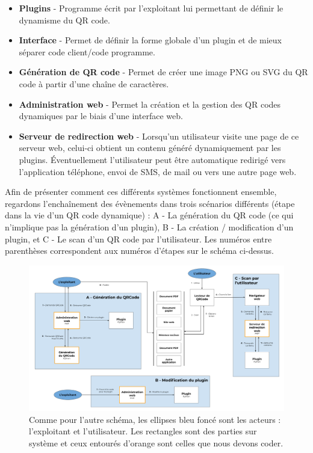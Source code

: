 \documentclass[a4paper,12pt]{article}
\begin{document}
\begin{itemize}
  \item \textbf{Plugins} - Programme écrit par l'exploitant lui permettant de définir le dynamisme du QR code.\\
  
  \item \textbf{Interface} - Permet de définir la forme globale d'un plugin et de mieux séparer code client/code programme.\\
  
  \item \textbf{Génération de QR code} - Permet de créer une image PNG ou SVG du QR code à partir d'une chaîne de caractères.\\
  
  \item \textbf{Administration web} - Permet la création et la gestion des QR codes dynamiques par le biais d'une interface web.\\
  
  \item \textbf{Serveur de redirection web} - Lorsqu'un utilisateur visite une page de ce serveur web, celui-ci obtient un contenu généré dynamiquement par les plugins. Éventuellement l'utilisateur peut être automatique redirigé vers l'application téléphone, envoi de SMS, de mail ou vers une autre page web.\\
  
\end{itemize}

Afin de présenter comment ces différents systèmes fonctionnent ensemble, regardons l'enchaînement des évènements dans trois scénarios différents (étape dans la vie d'un QR code dynamique) : A - La génération du QR code (ce qui n'implique pas la génération d'un plugin), B - La création / modification d'un plugin, et C - Le scan d'un QR code par l'utilisateur. Les numéros entre parenthèses correspondent aux numéros d'étapes sur le schéma ci-dessus.\\

\begin{figure}[H]
\begin{center}
  \noindent\includegraphics[width=\textwidth]{Organigramme QRCode redirection.png}
  \caption{Comme pour l'autre schéma, les ellipses bleu foncé sont les acteurs : l'exploitant et l'utilisateur. Les rectangles sont des parties sur système et ceux entourés d'orange sont celles que nous devons coder.}
\end{center}
\end{figure}
\end{document}
